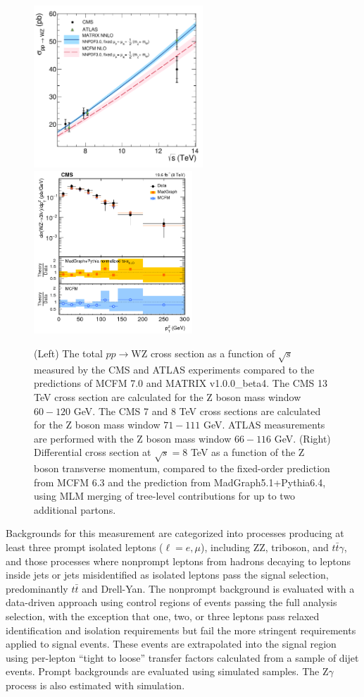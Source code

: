 \documentclass[10pt]{article}
\begin{document}
\begin{figure}[htb]
  \centering
    \includegraphics[height=2.4in]{figures/WZCrossSection_vs_sqrtS.pdf}
    \includegraphics[height=2.4in]{figures/WZ8TeV_ptZ_unfolded.png}
    \caption{ (Left) The total $pp \rightarrow $WZ cross section
      as a function of $\sqrt{s}$ measured by the CMS and 
      ATLAS experiments compared to the predictions of MCFM 7.0 and MATRIX v1.0.0\_beta4. 
      The CMS 13 TeV cross section are calculated for the Z boson mass window $60 - 120$ GeV. 
      The CMS 7 and 8  TeV  cross sections are calculated for the Z boson mass window $71 - 111$ GeV.
      ATLAS measurements are performed with the Z boson mass window $66 - 116$  GeV.
      (Right) Differential cross section at $\sqrt{s} = 8$ TeV as a function
      of the Z boson transverse momentum, compared to
      the fixed-order prediction from MCFM 6.3 and the prediction from
      MadGraph5.1+Pythia6.4, using MLM merging of tree-level contributions 
      for up to two additional partons.
      }
  \label{fig:WZfigs}
\end{figure}

Backgrounds for this measurement are categorized into processes producing at least
three prompt isolated leptons ($\ell = e, \mu$), including ZZ, triboson, and 
$t\bar{t}\gamma$, and those processes where nonprompt
leptons from hadrons decaying to leptons inside jets or jets misidentified as isolated
leptons pass the signal selection, predominantly $t\bar{t}$ and Drell-Yan. 
The nonprompt background is evaluated with a data-driven approach using 
control regions of events passing the full analysis selection,
with the exception that one, two, or three leptons pass relaxed identification 
and isolation requirements but fail the more stringent requirements applied to signal events.
These events are extrapolated into the signal region using per-lepton 
``tight to loose'' transfer factors
calculated from a sample of dijet events. Prompt backgrounds are evaluated using 
simulated samples. The Z$\gamma$ process is also estimated with simulation.
\end{document}
